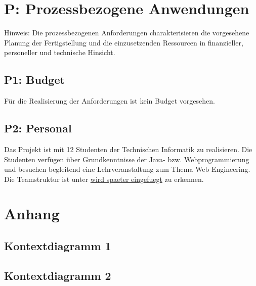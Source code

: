 \documentclass[10pt,a4paper]{scrartcl}
\begin{document}
\section{P: Prozessbezogene Anwendungen}
Hinweis: Die prozessbezogenen Anforderungen charakterisieren die vorgesehene Planung der Fertigstellung und die einzusetzenden Ressourcen in finanzieller, personeller und technische Hinsicht.

\subsection{P1: Budget}
Für die Realisierung der Anforderungen ist kein Budget vorgesehen.


\subsection{P2: Personal}
Das Projekt ist mit 12 Studenten der Technischen Informatik zu realisieren. Die Studenten verfügen über Grundkenntnisse der Java- bzw. Webprogrammierung und besuchen begleitend eine Lehrveranstaltung zum Thema Web Engineering. Die Teamstruktur ist unter \url{
wird spaeter eingefuegt} zu erkennen.

\newpage
\section{Anhang}
\subsection{Kontextdiagramm 1}
\subsection{Kontextdiagramm 2}

\end{document}
